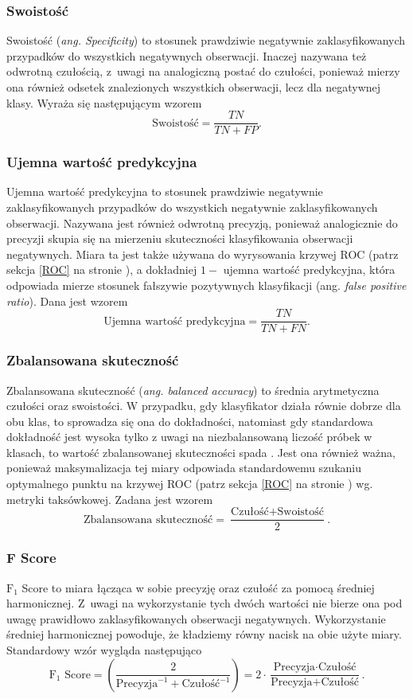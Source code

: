 \documentclass[inzynierska]{pwr_wmat_praca_dyplomowa}
\theoremstyle{plain}
\numberwithin{theorem}{chapter}
\theoremstyle{definition}
\numberwithin{theorem}{chapter}
\begin{document}
\subsubsection{Swoistość}
Swoistość (\textit{ang. Specificity}) to stosunek prawdziwie negatywnie zaklasyfikowanych przypadków do wszystkich negatywnych obserwacji. Inaczej nazywana też odwrotną czułością, z~uwagi na analogiczną postać do czułości, ponieważ mierzy ona również odsetek znalezionych wszystkich obserwacji, lecz dla negatywnej klasy. Wyraża się następującym wzorem
$$ \text{Swoistość}= \frac{TN}{TN + FP} \text{.}$$

\subsubsection{Ujemna wartość predykcyjna}
Ujemna wartość predykcyjna to stosunek prawdziwie negatywnie zaklasyfikowanych przypadków do wszystkich negatywnie zaklasyfikowanych obserwacji. Nazywana jest również odwrotną precyzją, ponieważ analogicznie do precyzji skupia się na mierzeniu skuteczności klasyfikowania obserwacji negatywnych. Miara ta jest także używana do wyrysowania krzywej ROC (patrz sekcja \ref{ROC} na stronie \pageref{ROC}), a dokładniej $1-$ ujemna wartość predykcyjna, która odpowiada mierze stosunek fałszywie pozytywnych klasyfikacji (ang. \textit{false positive ratio}). Dana jest wzorem
$$ \text{Ujemna wartość predykcyjna}= \frac{TN}{TN + FN} \text{.}$$

\subsubsection{Zbalansowana skuteczność} 
Zbalansowana skuteczność (\textit{ang. balanced accuracy}) to średnia arytmetyczna czułości oraz swoistości. W przypadku, gdy klasyfikator działa równie dobrze dla obu klas, to sprowadza się ona do dokładności, natomiast gdy standardowa dokładność jest wysoka tylko z uwagi na niezbalansowaną liczość próbek w klasach, to wartość zbalansowanej skuteczności spada \cite{balanced_accuracy}. Jest ona również ważna, ponieważ maksymalizacja tej miary odpowiada standardowemu szukaniu optymalnego punktu na krzywej ROC (patrz sekcja \ref{ROC} na stronie \pageref{ROC}) wg. metryki taksówkowej. Zadana jest wzorem
$$ \text{Zbalansowana skuteczność}= \frac{\text{Czułość} + \text{Swoistość}}{2} \text{.}$$

\subsubsection{F Score}
$\text{F}_1$ Score to miara łącząca w sobie precyzję oraz czułość za pomocą średniej harmonicznej. Z~uwagi na wykorzystanie tych dwóch wartości nie bierze ona pod uwagę prawidłowo zaklasyfikowanych obserwacji negatywnych. Wykorzystanie średniej harmonicznej powoduje, że kładziemy równy nacisk na obie użyte miary. Standardowy wzór wygląda następująco
$$ \text{F}_1 \text{ Score} = \left(\frac{2}{\text{Precyzja}^{-1} + \text{Czułość}^{-1}}\right) = 2 \cdot \frac{\text{Precyzja} \cdot \text{Czułość}}{\text{Precyzja} + \text{Czułość}} \text{.}$$
\end{document}
